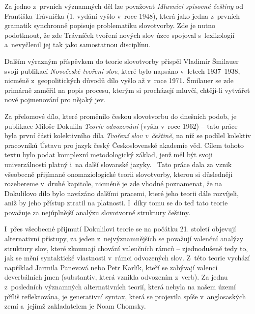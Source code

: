 Za jedno z~prvních významných děl lze považovat \emph{Mluvnici spisovné
češtiny} od Františka Trávníčka (1. vydání vyšlo v~roce 1948), která
jako jedna z~prvních gramatik synchronně popisuje problematiku
slovotvorby. Zde je nutno podotknout, že zde Trávníček tvoření nových
slov úzce spojoval s~lexikologií a~nevyčlenil jej tak jako samostatnou
disciplínu.~\parencite[263]{rousinova07}

Dalším výrazným příspěvkem do teorie slovotvorby přispěl Vladimír
Šmilauer svojí publikací \emph{Novočeské tvoření slov}, které bylo
napsáno v~letech 1937--1938, nicméně z~geopolitických důvodů dílo vyšlo
až v~roce 1971. Šmilauer se zde primárně zaměřil na popis procesu,
kterým si procházejí mluvčí, chtějí-li vytvářet nové pojmenování pro
nějaký jev.~\parencite[265]{rousinova07}

Za přelomové dílo, které proměnilo českou slovotvorbu do dnešních podob,
je publikace Miloše Dokulila \emph{Teorie odvozování} (vyšla v~roce
1962) -- tato práce byla první částí kolektivního díla \emph{Tvoření
slov v~češtině}, na níž se podílel kolektiv pracovníků Ústavu pro jazyk
český Československé akademie věd. Cílem tohoto textu bylo podat
komplexní metodologický základ, jenž měl být svoji univerzálností platný
i~na další slovanské jazyky.~\parencite[267]{rousinova07} Tato práce
dala za vznik všeobecně přijímané onomaziologické teorii slovotvorby,
kterou si důsledněji rozebereme v~druhé kapitole, nicméně je zde vhodné
poznamenat, že na Dokulilovo dílo bylo navázáno dalšími pracemi, které
jeho teorii dále rozvíjeli, aniž by jeho přístup ztratil na platnosti.
\parencite[272]{rousinova07} I~díky tomu se do teď tato teorie považuje
za nejúplnější analýzu slovotvorné struktury češtiny.
\parencite[273]{zikova07}

I~přes všeobecné přijmutí Dokulilovi teorie se na počátku 21. století
objevují alternativní přístupy, za jeden z~nejvýznamnějších se považují
valenční analýzy struktury slov, které zkoumají chování valenčních rámců
-- zjednodušeně tedy to, jak se mění syntaktické vlastnosti v~rámci
odvozených slov. Z~této teorie vychází například Jarmila Panevová nebo
Petr Karlík, kteří se zabývají valencí deverbálních jmen (substantiv,
která vznikla odvozením z~verb). Za jednu z~posledních významných
alternativních teorií, která nebyla na našem území příliš reflektována,
je generativní syntax, která se projevila spíše v~anglosaských zemí
a~jejímž zakladatelem je Noam Chomsky.~\parencite[274--275]{zikova07}
